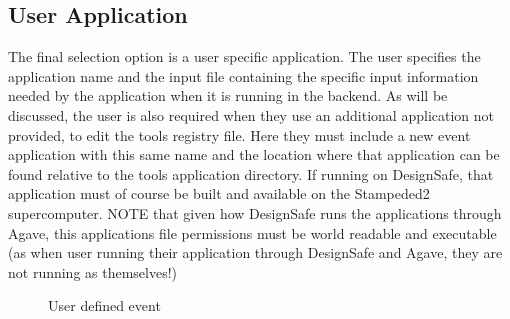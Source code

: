 \subsection{User Application}
The final selection option is a user specific application. 
The user specifies the application name and the input file containing the specific input information 
needed by the application when it is running in the backend. 
As will be discussed, the user is also required when they use an additional application not provided, 
to edit the tools registry file. Here they must include a new event application with this same name 
and the location where that application can be found relative to the tools application directory. 
If running on DesignSafe, that application must of course be built and available on the Stampeded2 supercomputer. 
NOTE that given how DesignSafe runs the applications through Agave, this applications file permissions must be 
world readable and executable (as when user running their application through DesignSafe and Agave, they are not running as themselves!)

\begin{figure}[!htbp]
  \caption{User defined event}
  \label{fig:figure8}
\end{figure}


